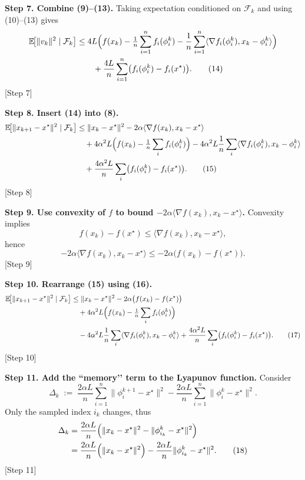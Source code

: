 \documentclass{article}
\begin{document}
\noindent\textbf{Step 7. Combine (9)–(13).}
Taking expectation conditioned on $\mathcal{F}_k$ and using (10)–(13) gives
\[
\begin{aligned}
\mathbb{E}\!\bigl[\|v_k\|^2\mid\mathcal{F}_k\bigr]
&\le 4L\Bigl( f(x_k)-\tfrac{1}{n}\sum_{i=1}^{n}f_i(\phi_i^k)
          -\frac{1}{n}\sum_{i=1}^{n}\langle\nabla f_i(\phi_i^k),x_k-\phi_i^k\rangle\Bigr)\\
&\qquad+ \frac{4L}{n}\sum_{i=1}^{n}\bigl(f_i(\phi_i^k)-f_i(x^\star)\bigr). \tag{14}
\end{aligned}
\]
[Step 7]

\noindent\textbf{Step 8. Insert (14) into (8).}
\[
\begin{aligned}
\mathbb{E}\!\bigl[\|x_{k+1}-x^\star\|^2\mid\mathcal{F}_k\bigr]
&\le \|x_k-x^\star\|^2-2\alpha\langle\nabla f(x_k),x_k-x^\star\rangle \\
&\quad +4\alpha^2L\Bigl( f(x_k)-\tfrac{1}{n}\sum_{i}f_i(\phi_i^k)\Bigr)
   -4\alpha^2L\frac{1}{n}\sum_{i}\langle\nabla f_i(\phi_i^k),x_k-\phi_i^k\rangle\\
&\quad +\frac{4\alpha^2L}{n}\sum_{i}\bigl(f_i(\phi_i^k)-f_i(x^\star)\bigr). \tag{15}
\end{aligned}
\]
[Step 8]

\noindent\textbf{Step 9. Use convexity of $f$ to bound $-2\alpha\langle\nabla f(x_k),x_k-x^\star\rangle$.}
Convexity implies
\[
f(x_k)-f(x^\star)\le\langle\nabla f(x_k),x_k-x^\star\rangle,
\]
hence
\[
-2\alpha\langle\nabla f(x_k),x_k-x^\star\rangle
\le -2\alpha\bigl(f(x_k)-f(x^\star)\bigr). \tag{16}
\]
[Step 9]

\noindent\textbf{Step 10. Rearrange (15) using (16).}
\[
\begin{aligned}
\mathbb{E}\!\bigl[\|x_{k+1}-x^\star\|^2\mid\mathcal{F}_k\bigr]
&\le \|x_k-x^\star\|^2
   -2\alpha\bigl(f(x_k)-f(x^\star)\bigr) \\
&\quad+4\alpha^2L\Bigl( f(x_k)-\tfrac{1}{n}\sum_{i}f_i(\phi_i^k)\Bigr)\\
&\quad-4\alpha^2L\frac{1}{n}\sum_{i}\langle\nabla f_i(\phi_i^k),x_k-\phi_i^k\rangle
   +\frac{4\alpha^2L}{n}\sum_{i}\bigl(f_i(\phi_i^k)-f_i(x^\star)\bigr). \tag{17}
\end{aligned}
\]
[Step 10]

\noindent\textbf{Step 11. Add the “memory’’ term to the Lyapunov function.}
Consider
\[
\Delta_k \;:=\; \frac{2\alpha L}{n}\sum_{i=1}^{n}\|\phi_i^{k+1}-x^\star\|^2
               -\frac{2\alpha L}{n}\sum_{i=1}^{n}\|\phi_i^{k}-x^\star\|^2 .
\]
Only the sampled index $i_k$ changes, thus
\[
\begin{aligned}
\Delta_k
&=\frac{2\alpha L}{n}\Bigl(\|x_k-x^\star\|^2-\|\phi_{i_k}^k-x^\star\|^2\Bigr)\\
&=\frac{2\alpha L}{n}\Bigl(\|x_k-x^\star\|^2\Bigr)
   -\frac{2\alpha L}{n}\|\phi_{i_k}^k-x^\star\|^2 . \tag{18}
\end{aligned}
\]
[Step 11]
\end{document}
